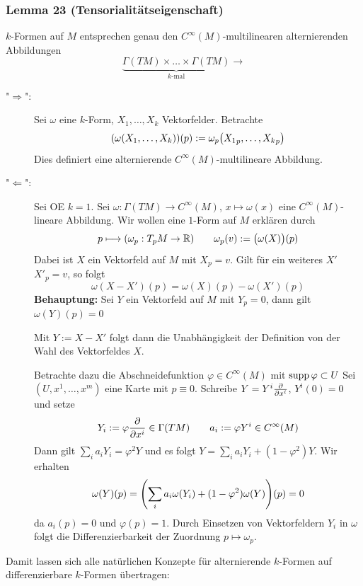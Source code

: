 \subsubsection{Lemma 23 (Tensorialitätseigenschaft)} %
\label{ssub:523}
$k$-Formen auf $M$ entsprechen genau den $C^\infty(M)$-multilinearen alternierenden Abbildungen
\[
	\underbrace{\Gamma(T M) \times \ldots \times \Gamma(T M)}_{\text{$k$-mal}} \longrightarrow
\]
\begin{description}
	\item["$\Rightarrow$":] Sei $\omega$ eine $k$-Form, $X_1, \ldots , X_k$ Vektorfelder. Betrachte
	\[
		\enbrace*{\omega \enbrace*{X_1, \ldots , X_k} } (p) := \omega_p \enbrace*{{X_1}_p, \ldots, {X_k}_p}  
	\] 
	Dies definiert eine alternierende $C^\infty(M)$-multilineare Abbildung.
	\item["$\Leftarrow$":] Sei OE $k=1$. Sei $\omega : \Gamma(T M) \to C^\infty(M)$, $x \mapsto \omega(x)$ eine $C^\infty(M)$-lineare Abbildung. Wir wollen eine $1$-Form auf
	$M$ erklären durch
	\[
		p \longmapsto \enbrace*{\omega_p : T_pM \to \mathds{R}} \qquad \omega_p(v) := \enbrace[\big]{\omega(X)}(p) 
	\]
	Dabei ist $X$ ein Vektorfeld auf $M$ mit $X_p= v$. Gilt für ein weiteres $X'$ $X'_p =v$, so folgt
	\[
		\omega(X - X')(p) = \omega(X)(p) - \omega(X')(p)
	\]
	\textbf{Behauptung:} Sei $Y$ ein Vektorfeld auf $M$ mit $Y_p =0$, dann gilt $\omega(Y)(p)=0$
	
	Mit $Y := X -X'$ folgt dann die Unabhängigkeit der Definition von der Wahl des Vektorfeldes $X$.
	
	Betrachte dazu die Abschneidefunktion $\varphi \in C^\infty(M)$ mit $\operatorname{supp} \varphi \subset U$
	Sei $(U, x^1, \ldots , x^m)$ eine Karte mit $p \equiv 0$. Schreibe $Y = Y^i \frac{{\partial }}{{\partial x^i}} $, $Y^i(0)=0$ und setze
	\[
		Y_i := \varphi \frac{{\partial }}{{\partial x^i}}   \in \Gamma(T M) \qquad a_i := \varphi Y^i \in C^\infty(M) 
	\]
	Dann gilt $\sum_i a_i Y_i = \varphi^2 Y$ und es folgt $Y = \sum_i a_i Y_i + (1- \varphi^2) Y$. Wir erhalten
	\[
		\omega(Y)(p) = \enbrace*{\sum_i a_i \omega(Y_i) + (1-\varphi^2) \omega(Y)}(p) = 0 
	\]
	da $a_i(p)=0$ und $\varphi(p)=1$. Durch Einsetzen von Vektorfeldern $Y_i$ in $\omega$ folgt die Differenzierbarkeit der Zuordnung $p\mapsto\omega_p$. \bewende
\end{description}
Damit lassen sich alle natürlichen Konzepte für alternierende $k$-Formen auf differenzierbare $k$-Formen übertragen:

